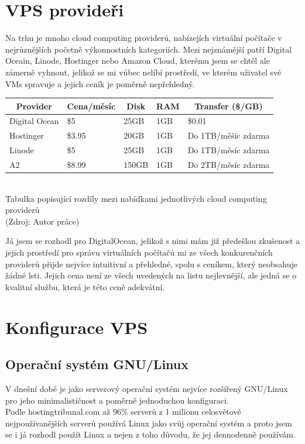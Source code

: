 \documentclass[12pt,a4paper]{report}
\begin{document}
  \section{VPS provideři}
  Na trhu je mnoho cloud computing providerů, nabízejích virtuální počítače
  v nejrůznějších početně výkonnostních kategoriích. Mezi nejznámější patří Digital Oceain,
  Linode, Hostinger nebo Amazon Cloud, kterému jsem se chtěl ale zámerně vyhnout, jelikož se mi vůbec nelíbí 
  prostředí, ve kterém uživatel své VMs spravuje a jejich ceník je poměrně nepřehledný.
  \begin{center}
    \noindent\begin{tabular}{|l|l|l|l|l|}
      \multicolumn{1}{c}{\bfseries Provider} & \multicolumn{1}{c}{\bfseries Cena/měsíc} & \multicolumn{1}{c}{\bfseries Disk} & \multicolumn{1}{c}{\bfseries RAM} & \multicolumn{1}{c}{\bfseries Transfer (\$/GB)} \\ \hline
      Digital Ocean & \$5 & 25GB & 1GB & \$0.01 \\ \hline
      Hostinger & \$3.95 & 20GB & 1GB & Do 1TB/měšíc zdarma \\ \hline
      Linode & \$5 & 25GB & 1GB & Do 1TB/měsíc zdarma \\ \hline
      A2 & \$8.99 & 150GB & 1GB & Do 2TB/měsíc zdarma \\ \hline
    \end{tabular}\\
    \vspace{0.5cm}
    Tabulka popisující rozdíly mezi nabídkami jednotlivých cloud computing providerů  \\
    (Zdroj: Autor práce)
  \end{center}
  Já jsem se rozhodl pro DigitalOcean, jelikož s nimi mám již předešlou 
  zkušenost a jejich prostředí pro správu virtuálních počítačů mi ze všech 
  konkurenčních providerů přijde nejvíce intuitivní a přehledné, spolu s ceníkem, 
  který neobsahuje žádné lsti. Jejich cena není ze všech uvedených na listu nejlevnější,
  ale jedná se o kvalitní službu, která je této ceně adekvátní.  
  \section{Konfigurace VPS}
  \subsection{Operační systém GNU/Linux}
  V dnešní době je jako serverový operační systém nejvíce rozšířený GNU/Linux pro jeho
  minimalističnost a poměrně jednoduchou konfiguraci.\\ Podle hostingtribunal.com až 96\% serverů z
  1 milionu celosvětově nejpoužívanějších serverů používá Linux jako svůj operační systém a proto
  jsem se i já rozhodl použít Linux a nejen z toho důvodu, že jej dennodenně používám.
\end{document}
